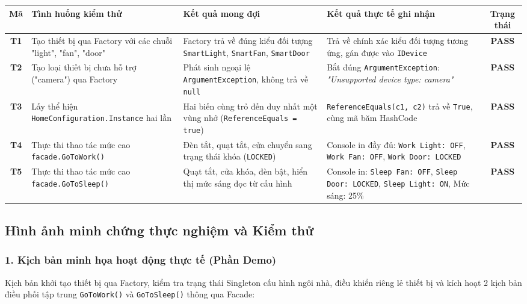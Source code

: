 \documentclass[11pt,a4paper]{article}
\begin{document}
\begin{table}[H]
\centering
\footnotesize
\renewcommand{\arraystretch}{1.20}
\begin{tabular}{cp{3.8cm}p{4.5cm}p{4.6cm}c}
\toprule
\textbf{Mã} & \textbf{Tình huống kiểm thử} & \textbf{Kết quả mong đợi} & \textbf{Kết quả thực tế ghi nhận} & \textbf{Trạng thái} \\
\midrule
\textbf{T1} & Tạo thiết bị qua Factory với các chuỗi "light", "fan", "door" & Factory trả về đúng kiểu đối tượng \texttt{SmartLight}, \texttt{SmartFan}, \texttt{SmartDoor} & Trả về chính xác kiểu đối tượng tương ứng, gán được vào \texttt{IDevice} & \textbf{PASS} \\
\midrule
\textbf{T2} & Tạo loại thiết bị chưa hỗ trợ ("camera") qua Factory & Phát sinh ngoại lệ \texttt{ArgumentException}, không trả về \texttt{null} & Bắt đúng \texttt{ArgumentException}: \textit{"Unsupported device type: camera"} & \textbf{PASS} \\
\midrule
\textbf{T3} & Lấy thể hiện \texttt{HomeConfiguration.Instance} hai lần & Hai biến cùng trỏ đến duy nhất một vùng nhớ (\texttt{ReferenceEquals = true}) & \texttt{ReferenceEquals(c1, c2)} trả về \texttt{True}, cùng mã băm HashCode & \textbf{PASS} \\
\midrule
\textbf{T4} & Thực thi thao tác mức cao \texttt{facade.GoToWork()} & Đèn tắt, quạt tắt, cửa chuyển sang trạng thái khóa (\texttt{LOCKED}) & Console in đầy đủ: \texttt{Work Light: OFF}, \texttt{Work Fan: OFF}, \texttt{Work Door: LOCKED} & \textbf{PASS} \\
\midrule
\textbf{T5} & Thực thi thao tác mức cao \texttt{facade.GoToSleep()} & Quạt tắt, cửa khóa, đèn bật, hiển thị mức sáng đọc từ cấu hình & Console in: \texttt{Sleep Fan: OFF}, \texttt{Sleep Door: LOCKED}, \texttt{Sleep Light: ON}, Mức sáng: 25\% & \textbf{PASS} \\
\bottomrule
\end{tabular}
\end{table}

\newpage

\subsection{Hình ảnh minh chứng thực nghiệm và Kiểm thử}

\subsubsection{1. Kịch bản minh họa hoạt động thực tế (Phần Demo)}
Kịch bản khởi tạo thiết bị qua Factory, kiểm tra trạng thái Singleton cấu hình ngôi nhà, điều khiển riêng lẻ thiết bị và kích hoạt 2 kịch bản điều phối tập trung \texttt{GoToWork()} và \texttt{GoToSleep()} thông qua Facade:
\end{document}
